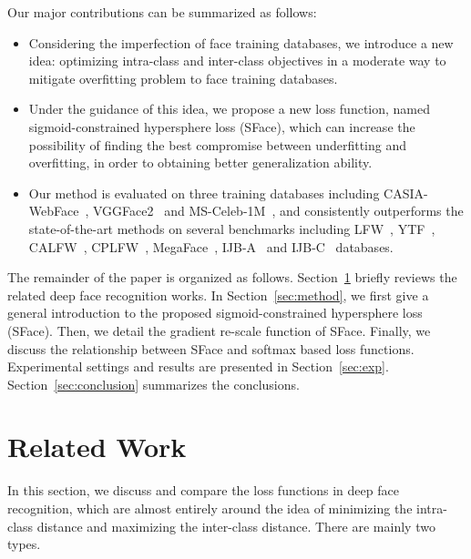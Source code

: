 \documentclass[journal,comsoc]{IEEEtran}
\begin{document}
Our major contributions can be summarized as follows:
\begin{itemize}
\item{Considering the imperfection of face training databases, we introduce a new idea: optimizing intra-class and inter-class objectives in a moderate way to mitigate overfitting problem to face training databases.}
\item{Under the guidance of this idea, we propose a new loss function, named sigmoid-constrained hypersphere loss (SFace), which can increase the possibility of finding the best compromise between underfitting and overfitting, in order to obtaining better generalization ability.}
\item{Our method is evaluated on three training databases including CASIA-WebFace~\cite{Yi2014CASIA}, VGGFace2~\cite{Cao18} and MS-Celeb-1M~\cite{guo2016msceleb}, and consistently outperforms the state-of-the-art methods on several benchmarks including LFW~\cite{LFWTech}, YTF~\cite{Wolf2011Face}, CALFW~\cite{zheng2017CALFW}, CPLFW~\cite{CPLFWTech}, MegaFace~\cite{kemelmacher2016megaface}, IJB-A~\cite{klare2015pushing} and IJB-C~\cite{maze2018iarpa} databases. }
\end{itemize}

The remainder of the paper is organized as follows. Section~\ref{sec:related} briefly reviews the related deep face recognition works. In Section~\ref{sec:method}, we first give a general introduction to the proposed sigmoid-constrained hypersphere loss (SFace). Then, we detail the gradient re-scale function of SFace. Finally, we discuss the relationship between SFace and softmax based loss functions. Experimental settings and results are presented in Section~\ref{sec:exp}. Section~\ref{sec:conclusion} summarizes the conclusions.




\section{Related Work}
\label{sec:related}
In this section, we discuss and compare the loss functions in deep face recognition, which are almost entirely around the idea of minimizing the intra-class distance and maximizing the inter-class distance. There are mainly two types. 
\end{document}

